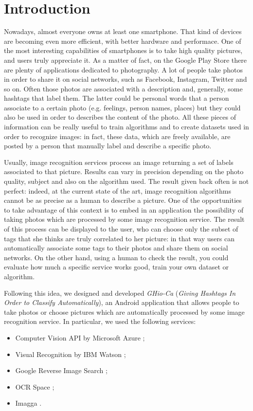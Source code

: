 \section{Introduction}
\label{sec:introduction}

Nowadays, almost everyone owns at least one smartphone. That kind of devices 
are becoming even more efficient, with better hardware and performace. One of 
the most interesting capabilities of smartphones is to take high quality 
pictures, and users truly appreciate it. As a matter of fact, on the Google Play 
Store there are plenty of applications dedicated to photography.
A lot of people take photos in order to share it on social networks, such as 
Facebook, Instagram, Twitter and so on. Often those photos are associated with 
a description and, generally, some hashtags that label them. The latter could 
be personal words that a person associate to a certain photo (e.g. feelings, 
person names, places) but they could also be used in order to describes the 
content of the photo.
All these pieces of information can be really useful to train algorithms and to 
create datasets used in order to recognize images: in fact, these data, which 
are freely available, are posted by a person that manually label and describe a 
specific photo.

Usually, image recognition services process an image returning a set of labels 
associated to that picture. Results can vary in precision depending on the photo 
quality, subject and also on the algorithm used. 
The result given back often is not perfect: indeed, at the current state of the 
art, image recognition algorithms cannot be as precise as a human to describe a 
picture.
One of the opportunities to take advantage of this context is to embed in an 
application the possibility of taking photos which are processed by some image 
recognition service. The result of this process can be displayed to the 
user, who can choose only the subset of tags that she thinks are truly 
correlated to her picture: in that way users can automatically associate some 
tags to their photos and share them on social networks. On the other hand, using 
a human to check the result, you could evaluate how much a specific service 
works good, train your own dataset or algorithm.

Following this idea, we designed and developed \textit{GHio-Ca} (\textit{Giving 
Hashtags In Order to Classify Automatically}), an Android application that 
allows people to take photos or choose pictures which are automatically 
processed by some image recognition service. In particular, we used the 
following services:
\begin{itemize}
  \item Computer Vision API by Microsoft Azure \cite{Microsoft};
  \item Visual Recognition by IBM Watson \cite{IBM};
  \item Google Reverse Image Search \cite{Google};
  \item OCR Space \cite{OCR};
  \item Imagga \cite{Imagga}.
\end{itemize}

